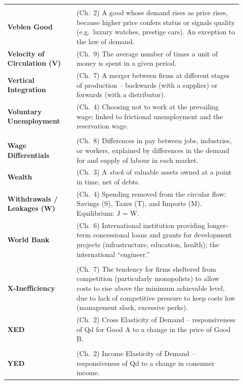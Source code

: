 \documentclass[11pt, a4paper, twoside]{book}
\begin{document}
\begin{longtable}{@{}>{\RaggedRight\arraybackslash}p{0.28\linewidth}>{\RaggedRight\arraybackslash}p{0.67\linewidth}@{}}
\multicolumn{2}{@{}l}{\textbf{\Large\color{CurveNavy} V}} \\[2pt]
\textbf{Veblen Good} & (Ch.~2) A good whose demand rises as price rises, because higher price confers status or signals quality (e.g.\ luxury watches, prestige cars). An exception to the law of demand. \\
\textbf{Velocity of Circulation (V)} & (Ch.~9) The average number of times a unit of money is spent in a given period. \\
\textbf{Vertical Integration} & (Ch.~7) A merger between firms at different stages of production -- backwards (with a supplier) or forwards (with a distributor). \\
\textbf{Voluntary Unemployment} & (Ch.~4) Choosing not to work at the prevailing wage; linked to frictional unemployment and the reservation wage. \\

\multicolumn{2}{@{}l}{\textbf{\Large\color{CurveNavy} W}} \\[2pt]
\textbf{Wage Differentials} & (Ch.~8) Differences in pay between jobs, industries, or workers, explained by differences in the demand for and supply of labour in each market. \\
\textbf{Wealth} & (Ch.~3) A \emph{stock} of valuable assets owned at a point in time, net of debts. \\
\textbf{Withdrawals / Leakages (W)} & (Ch.~4) Spending removed from the circular flow: Savings (S), Taxes (T), and Imports (M). Equilibrium: J = W. \\
\textbf{World Bank} & (Ch.~6) International institution providing longer-term concessional loans and grants for development projects (infrastructure, education, health); the international ``engineer.'' \\

\multicolumn{2}{@{}l}{\textbf{\Large\color{CurveNavy} X}} \\[2pt]
\textbf{X-Inefficiency} & (Ch.~7) The tendency for firms sheltered from competition (particularly monopolists) to allow costs to rise above the minimum achievable level, due to lack of competitive pressure to keep costs low (management slack, excessive perks). \\
\textbf{XED} & (Ch.~2) Cross Elasticity of Demand -- responsiveness of Qd for Good A to a change in the price of Good B. \\

\multicolumn{2}{@{}l}{\textbf{\Large\color{CurveNavy} Y}} \\[2pt]
\textbf{YED} & (Ch.~2) Income Elasticity of Demand -- responsiveness of Qd to a change in consumer income. \\

\end{longtable}
\end{document}
